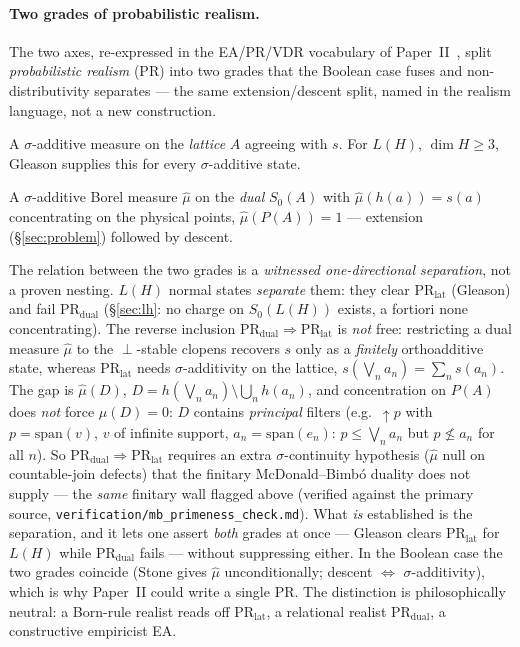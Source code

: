 \documentclass[11pt]{article}
\theoremstyle{definition}
\begin{document}
\paragraph{Two grades of probabilistic realism.}
The two axes, re-expressed in the EA/PR/VDR vocabulary of
Paper~II~\cite{MahonPaperII2026}, split \emph{probabilistic realism}
(PR) into two grades that the Boolean case fuses and non-distributivity
separates --- the same extension/descent split, named in the realism
language, not a new construction.
\begin{description}[style=nextline, font=\normalfont\bfseries,
    labelwidth=2.2cm, leftmargin=2.6cm]
  \item[$\text{PR}_{\text{lat}}$]
    A $\sigma$-additive measure on the \emph{lattice} $A$ agreeing with
    $s$. For $L(H)$, $\dim H \geq 3$, Gleason supplies this for every
    $\sigma$-additive state.
  \item[$\text{PR}_{\text{dual}}$]
    A $\sigma$-additive Borel measure $\hat\mu$ on the \emph{dual}
    $S_0(A)$ with $\hat\mu(h(a)) = s(a)$ concentrating on the physical
    points, $\hat\mu(P(A)) = 1$ --- extension (\S\ref{sec:problem})
    followed by descent.
\end{description}
The relation between the two grades is a \emph{witnessed
one-directional separation}, not a proven nesting.  $L(H)$ normal states
\emph{separate} them: they clear $\text{PR}_{\text{lat}}$ (Gleason) and
fail $\text{PR}_{\text{dual}}$ (\S\ref{sec:lh}: no charge on $S_0(L(H))$
exists, a fortiori none concentrating).  The reverse inclusion
$\text{PR}_{\text{dual}} \Rightarrow \text{PR}_{\text{lat}}$ is
\emph{not} free: restricting a dual measure $\hat\mu$ to the
$\perp$-stable clopens recovers $s$ only as a \emph{finitely}
orthoadditive state, whereas $\text{PR}_{\text{lat}}$ needs
$\sigma$-additivity on the lattice, $s(\bigvee_n a_n) = \sum_n s(a_n)$.
The gap is $\hat\mu(D)$, $D = h(\bigvee_n a_n) \setminus \bigcup_n
h(a_n)$, and concentration on $P(A)$ does \emph{not} force $\hat\mu(D) =
0$: $D$ contains \emph{principal} filters (e.g.\ $\uparrow\!p$ with
$p = \mathrm{span}(v)$, $v$ of infinite support, $a_n = \mathrm{span}(e_n)$:
$p \leq \bigvee_n a_n$ but $p \not\leq a_n$ for all $n$).  So
$\text{PR}_{\text{dual}} \Rightarrow \text{PR}_{\text{lat}}$ requires an
extra $\sigma$-continuity hypothesis ($\hat\mu$ null on countable-join
defects) that the finitary McDonald--Bimb\'{o} duality does not supply
--- the \emph{same} finitary wall flagged above (verified against the
primary source, \texttt{verification/mb\_primeness\_check.md}).  What
\emph{is} established is the separation, and it lets one assert
\emph{both} grades at once --- Gleason clears $\text{PR}_{\text{lat}}$
for $L(H)$ while $\text{PR}_{\text{dual}}$ fails --- without suppressing
either.  In the Boolean case the two grades coincide (Stone gives
$\hat\mu$ unconditionally; descent $\Leftrightarrow$ $\sigma$-additivity),
which is why Paper~II could write a single PR.  The distinction is
philosophically neutral: a Born-rule realist reads off
$\text{PR}_{\text{lat}}$, a relational realist $\text{PR}_{\text{dual}}$,
a constructive empiricist EA.
\end{document}
